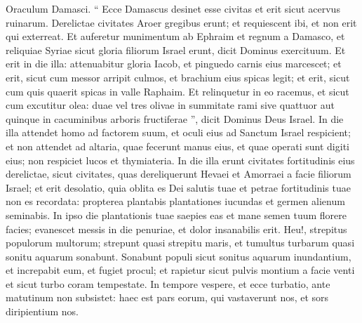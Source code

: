 \begin{biblechapter}
\begin{biblechapter}
\begin{biblechapter}
\begin{biblechapter}
\begin{biblechapter}
\begin{biblechapter}
\begin{biblechapter}
\begin{biblechapter}
\begin{biblechapter}
\begin{biblechapter}
\begin{biblechapter}
\begin{biblechapter}
\begin{biblechapter}
\begin{biblechapter}
\begin{biblechapter}
\begin{biblechapter}
\begin{biblechapter}
\verse Oraculum Damasci.
 “ Ecce Damascus desinet esse civitas
 et erit sicut acervus ruinarum.
 \verse Derelictae civitates Aroer gregibus erunt;
 et requiescent ibi, et non erit qui exterreat.
 \verse Et auferetur munimentum ab Ephraim
 et regnum a Damasco,
 et reliquiae Syriae sicut gloria filiorum Israel erunt,
 dicit Dominus exercituum.
 \verse Et erit in die illa: attenuabitur gloria Iacob,
 et pinguedo carnis eius marcescet;
 \verse et erit, sicut cum messor arripit culmos,
 et brachium eius spicas legit;
 et erit, sicut cum quis quaerit spicas in valle Raphaim.
 \verse Et relinquetur in eo racemus,
 et sicut cum excutitur olea:
 duae vel tres olivae in summitate rami
 sive quattuor aut quinque in cacuminibus arboris fructiferae ”,
 dicit Dominus Deus Israel.
 \verse In die illa attendet homo ad factorem suum,
 et oculi eius ad Sanctum Israel respicient;
 \verse et non attendet ad altaria,
 quae fecerunt manus eius,
 et quae operati sunt digiti eius;
 non respiciet lucos et thymiateria.
 \verse In die illa erunt civitates fortitudinis eius derelictae,
 sicut civitates, quas dereliquerunt Hevaei et Amorraei
 a facie filiorum Israel;
 et erit desolatio,
 \verse quia oblita es Dei salutis tuae
 et petrae fortitudinis tuae non es recordata:
 propterea plantabis plantationes iucundas
 et germen alienum seminabis.
 \verse In ipso die plantationis tuae saepies eas
 et mane semen tuum florere facies;
 evanescet messis in die penuriae,
 et dolor insanabilis erit.
 \verse Heu!, strepitus populorum multorum;
 strepunt quasi strepitu maris,
 et tumultus turbarum
 quasi sonitu aquarum sonabunt.
 \verse Sonabunt populi sicut sonitus aquarum inundantium,
 et increpabit eum, et fugiet procul;
 et rapietur sicut pulvis montium a facie venti
 et sicut turbo coram tempestate.
 \verse In tempore vespere, et ecce turbatio,
 ante matutinum non subsistet:
 haec est pars eorum, qui vastaverunt nos,
 et sors diripientium nos.
 

\end{biblechapter}
\end{biblechapter}
\end{biblechapter}
\end{biblechapter}
\end{biblechapter}
\end{biblechapter}
\end{biblechapter}
\end{biblechapter}
\end{biblechapter}
\end{biblechapter}
\end{biblechapter}
\end{biblechapter}
\end{biblechapter}
\end{biblechapter}
\end{biblechapter}
\end{biblechapter}
\end{biblechapter}
